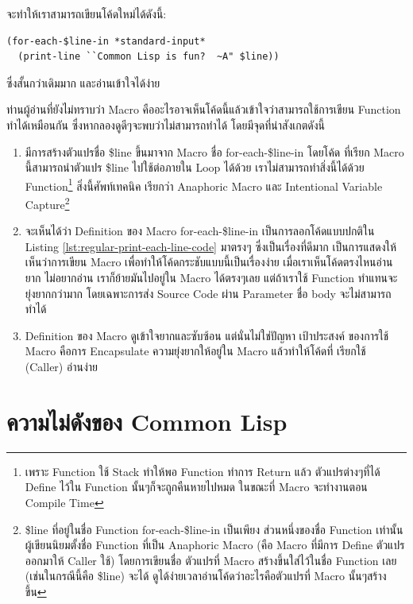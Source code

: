 \documentclass[a4paper]{article}
\begin{document}
จะทำให้เราสามารถเขียนโค้ดใหม่ได้ดังนี้:

\begin{lstlisting}[caption=โค้ดที่อ่านง่าย สบายตา ด้วยการใช้ Macro]
(for-each-$line-in *standard-input*
  (print-line ``Common Lisp is fun?  ~A" $line))
\end{lstlisting}

ซึ่งสั้นกว่าเดิมมาก และอ่านเข้าใจได้ง่าย

ท่านผู้อ่านที่ยังไม่ทราบว่า Macro คืออะไรอาจเห็นโค้ดนี้แล้วเข้าใจว่าสามารถใช้การเขียน
Function ทำได้เหมือนกัน ซึ่งหากลองดูดีๆจะพบว่าไม่สามารถทำได้ โดยมีจุดที่น่าสังเกตดังนี้

\begin{enumerate}
  \item มีการสร้างตัวแปรชื่อ \$line ขึ้นมาจาก Macro ชื่อ for-each-\$line-in โดยโค้ด%
    ที่เรียก Macro นี้สามารถนำตัวแปร \$line ไปใช้ต่อภายใน Loop ได้ด้วย
    เราไม่สามารถทำสิ่งนี้ได้ด้วย Function\footnote{เพราะ Function ใช้ Stack
    ทำให้พอ Function ทำการ Return แล้ว ตัวแปรต่างๆที่ได้ Define ไว้ใน Function
    นั้นๆก็จะถูกคืนหายไปหมด ในขณะที่ Macro จะทำงานตอน Compile Time} สิ่งนี้ศัพท์เทคนิค
    เรียกว่า Anaphoric Macro และ Intentional Variable
    Capture\footnote{\$line ที่อยู่ในชื่อ Function for-each-\$line-in เป็นเพียง%
    ส่วนหนึ่งของชื่อ Function เท่านั้น ผู้เขียนนิยมตั้งชื่อ Function ที่เป็น Anaphoric
    Macro (คือ Macro ที่มีการ Define ตัวแปรออกมาให้ Caller ใช้) โดยการเขียนชื่อ%
    ตัวแปรที่ Macro สร้างขึ้นใส่ไว้ในชื่อ Function เลย (เช่นในกรณีนี้คือ \$line) จะได้%
    ดูได้ง่ายเวลาอ่านโค้ดว่าอะไรคือตัวแปรที่ Macro นั้นๆสร้างขึ้น}
  \item จะเห็นได้ว่า Definition ของ Macro for-each-\$line-in
    เป็นการลอกโค้ดแบบปกติใน Listing \ref{lst:regular-print-each-line-code} มาตรงๆ
    ซึ่งเป็นเรื่องที่ดีมาก เป็นการแสดงให้เห็นว่าการเขียน Macro เพื่อทำให้โค้ดกระชับแบบนี้เป็นเรื่องง่าย
    เมื่อเราเห็นโค้ดตรงไหนอ่านยาก ไม่อยากอ่าน เราก็ย้ายมันไปอยู่ใน Macro ได้ตรงๆเลย
    แต่ถ้าเราใช้ Function ทำแทนจะยุ่งยากกว่ามาก โดยเฉพาะการส่ง Source Code
    ผ่าน Parameter ชื่อ body จะไม่สามารถทำได้
  \item Definition ของ Macro ดูเข้าใจยากและซับซ้อน แต่นั่นไม่ใช่ปัญหา เป้าประสงค์%
    ของการใช้ Macro คือการ Encapsulate ความยุ่งยากให้อยู่ใน Macro แล้วทำให้โค้ดที่%
    เรียกใช้ (Caller) อ่านง่าย
\end{enumerate}

\section{ความไม่ดังของ Common Lisp}
\end{document}
